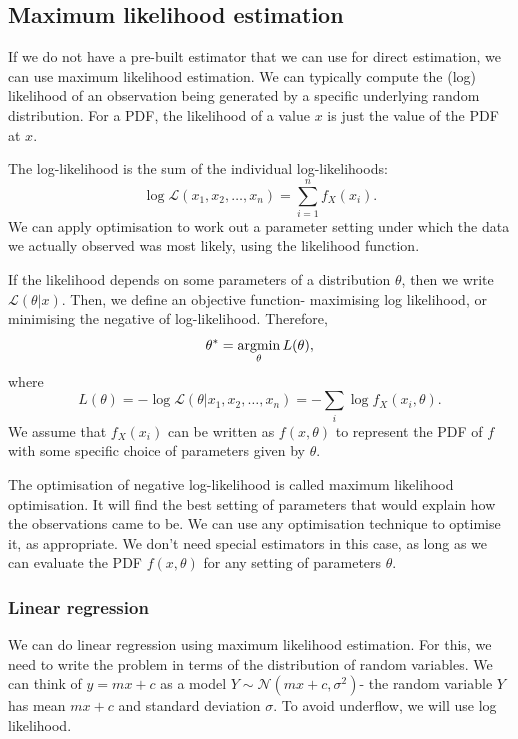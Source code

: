 \documentclass[a4paper, openany]{memoir}
\begin{document}
\subsection{Maximum likelihood estimation}
If we do not have a pre-built estimator that we can use for direct estimation, we can use maximum likelihood estimation. We can typically compute the (log) likelihood of an observation being generated by a specific underlying random distribution. For a PDF, the likelihood of a value $x$ is just the value of the PDF at $x$.

The log-likelihood is the sum of the individual log-likelihoods:
\[\log \mathcal{L}(x_1, x_2, \dots, x_n) = \sum_{i=1}^n f_X(x_i).\]
We can apply optimisation to work out a parameter setting under which the data we actually observed was most likely, using the likelihood function.

If the likelihood depends on some parameters of a distribution $\theta$, then we write $\mathcal{L}(\theta|x)$. Then, we define an objective function- maximising log likelihood, or minimising the negative of log-likelihood. Therefore,
\[\theta^* = \operatornamewithlimits{arg min}_\theta L(\theta),\]
where
\[L(\theta) = -\log \mathcal{L}(\theta | x_1, x_2, \dots, x_n) = -\sum_i \log f_X(x_i, \theta).\]
We assume that $f_X(x_i)$ can be written as $f(x, \theta)$ to represent the PDF of $f$ with some specific choice of parameters given by $\theta$.

The optimisation of negative log-likelihood is called maximum likelihood optimisation. It will find the best setting of parameters that would explain how the observations came to be. We can use any optimisation technique to optimise it, as appropriate. We don't need special estimators in this case, as long as we can evaluate the PDF $f(x, \theta)$ for any setting of parameters $\theta$.

\subsubsection{Linear regression}
We can do linear regression using maximum likelihood estimation. For this, we need to write the problem in terms of the distribution of random variables. We can think of $y = mx + c$ as a model $Y \sim \mathcal{N}(mx + c, \sigma^2)$- the random variable $Y$ has mean $mx + c$ and standard deviation $\sigma$. To avoid underflow, we will use log likelihood.
\end{document}
